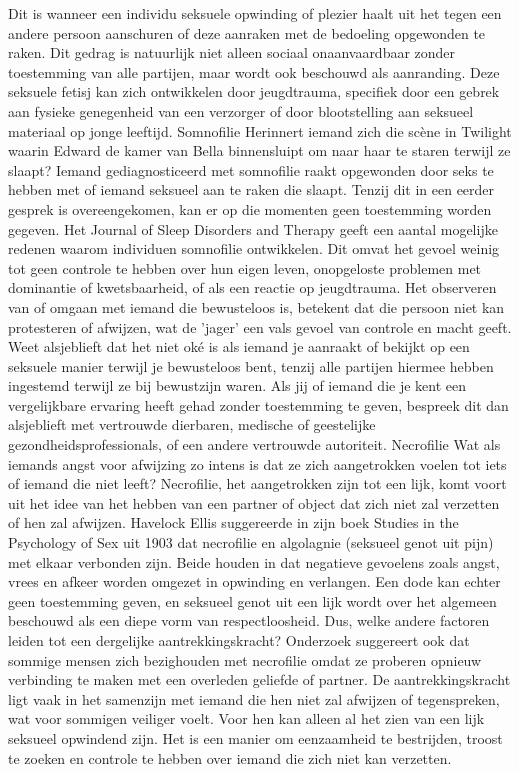 Dit is wanneer een individu seksuele opwinding of plezier haalt uit het tegen een andere persoon aanschuren of deze aanraken met de bedoeling opgewonden te raken. Dit gedrag is natuurlijk niet alleen sociaal onaanvaardbaar zonder toestemming van alle partijen, maar wordt ook beschouwd als aanranding. Deze seksuele fetisj kan zich ontwikkelen door jeugdtrauma, specifiek door een gebrek aan fysieke genegenheid van een verzorger of door blootstelling aan seksueel materiaal op jonge leeftijd.
Somnofilie
Herinnert iemand zich die scène in Twilight waarin Edward de kamer van Bella binnensluipt om naar haar te staren terwijl ze slaapt? Iemand gediagnosticeerd met somnofilie raakt opgewonden door seks te hebben met of iemand seksueel aan te raken die slaapt. Tenzij dit in een eerder gesprek is overeengekomen, kan er op die momenten geen toestemming worden gegeven.
Het Journal of Sleep Disorders and Therapy geeft een aantal mogelijke redenen waarom individuen somnofilie ontwikkelen. Dit omvat het gevoel weinig tot geen controle te hebben over hun eigen leven, onopgeloste problemen met dominantie of kwetsbaarheid, of als een reactie op jeugdtrauma. Het observeren van of omgaan met iemand die bewusteloos is, betekent dat die persoon niet kan protesteren of afwijzen, wat de 'jager' een vals gevoel van controle en macht geeft.
Weet alsjeblieft dat het niet oké is als iemand je aanraakt of bekijkt op een seksuele manier terwijl je bewusteloos bent, tenzij alle partijen hiermee hebben ingestemd terwijl ze bij bewustzijn waren. Als jij of iemand die je kent een vergelijkbare ervaring heeft gehad zonder toestemming te geven, bespreek dit dan alsjeblieft met vertrouwde dierbaren, medische of geestelijke gezondheidsprofessionals, of een andere vertrouwde autoriteit.
Necrofilie
Wat als iemands angst voor afwijzing zo intens is dat ze zich aangetrokken voelen tot iets of iemand die niet leeft? Necrofilie, het aangetrokken zijn tot een lijk, komt voort uit het idee van het hebben van een partner of object dat zich niet zal verzetten of hen zal afwijzen.
Havelock Ellis suggereerde in zijn boek Studies in the Psychology of Sex uit 1903 dat necrofilie en algolagnie (seksueel genot uit pijn) met elkaar verbonden zijn. Beide houden in dat negatieve gevoelens zoals angst, vrees en afkeer worden omgezet in opwinding en verlangen. Een dode kan echter geen toestemming geven, en seksueel genot uit een lijk wordt over het algemeen beschouwd als een diepe vorm van respectloosheid.
Dus, welke andere factoren leiden tot een dergelijke aantrekkingskracht? Onderzoek suggereert ook dat sommige mensen zich bezighouden met necrofilie omdat ze proberen opnieuw verbinding te maken met een overleden geliefde of partner. De aantrekkingskracht ligt vaak in het samenzijn met iemand die hen niet zal afwijzen of tegenspreken, wat voor sommigen veiliger voelt. Voor hen kan alleen al het zien van een lijk seksueel opwindend zijn. Het is een manier om eenzaamheid te bestrijden, troost te zoeken en controle te hebben over iemand die zich niet kan verzetten.
